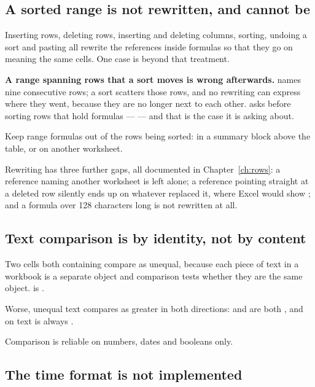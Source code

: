 \subsection{A sorted range is not rewritten, and cannot be}

Inserting rows, deleting rows, inserting and deleting columns, sorting, undoing
a sort and pasting all rewrite the references inside formulas so that they go on
meaning the same cells. One case is beyond that treatment.

\begin{cccaution}
\textbf{A range spanning rows that a sort moves is wrong afterwards.}
 names nine consecutive rows; a sort scatters those rows, and
no rewriting can express where they went, because they are no longer next to
each other. \ccprod{} asks before sorting rows that hold formulas ---
 --- and that is the case it is
asking about.

Keep range formulas out of the rows being sorted: in a summary block above the
table, or on another worksheet.
\end{cccaution}

Rewriting has three further gaps, all documented in Chapter~\ref{ch:rows}: a
reference naming another worksheet is left alone; a reference pointing straight
at a deleted row silently ends up on whatever replaced it, where Excel would
show ; and a formula over 128 characters long is not rewritten at
all.

\subsection{Text comparison is by identity, not by content}

\begin{cccaution}
Two cells both containing  compare as unequal, because each piece of
text in a workbook is a separate object and comparison tests whether they are
the same object.  is .

Worse, unequal text compares as greater in both directions:
 and  are both , and \lit{<} on text is
always .

Comparison is reliable on numbers, dates and booleans only.
\end{cccaution}

\subsection{The time format is not implemented}

